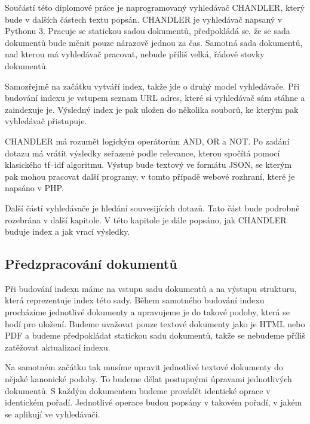 \documentclass[12pt]{article}
\newcommand{\name}{CHANDLER}
\begin{document}
Součástí této diplomové práce je naprogramovaný vyhledávač \name, který bude v dalších částech textu popsán. \name{} je vyhledávač napsaný v Pythonu 3. Pracuje se statickou sadou dokumentů, předpokládá se, že se sada dokumentů bude měnit pouze nárazově jednou za čas. Samotná sada dokumentů, nad kterou má vyhledávač pracovat, nebude příliš velká, řádově stovky dokumentů. 

Samozřejmě na začátku vytváří index, takže jde o druhý model vyhledávače. Při budování indexu je vstupem seznam URL adres, které si vyhledávač sám stáhne a zaindexuje je. Výsledný index je pak uložen do několika souborů, ke kterým pak vyhledávač přistupuje. 

\name{} má rozumět logickým operátorům AND, OR a NOT. Po zadání dotazu má vrátit výsledky seřazené podle relevance, kterou spočítá pomocí klasického tf–idf algoritmu. Výstup bude textový ve formátu JSON, se kterým pak mohou pracovat další programy, v tomto případě webové rozhraní, které je napsáno v PHP. 

Další částí vyhledávače je hledání souvesijících dotazů. Tato část bude podrobně rozebrána v další kapitole. V této kapitole je dále popsáno, jak \name{} buduje index a jak vrací výsledky. 



\subsection{Předzpracování dokumentů}

Při budování indexu máme na vstupu sadu dokumentů a na výstupu strukturu, která reprezentuje index této sady. Během samotného budování indexu procházíme jednotlivé dokumenty a upravujeme je do takové podoby, která se hodí pro uložení. Budeme uvažovat pouze textové dokumenty jako je HTML nebo PDF a budeme předpokládat statickou sadu dokumentů, takže se nebudeme příliš zatěžovat aktualizací indexu. 

Na samotném začátku tak musíme upravit jednotlivé textové dokumenty do nějaké kanonické podoby. To budeme dělat postupnými úpravami jednotlivých dokumentů. S každým dokumentem budeme provádět identické oprace v identickém pořadí. Jednotlivé operace budou popsány v takovém pořadí, v jakém se aplikují ve vyhledávači. 
\end{document}

